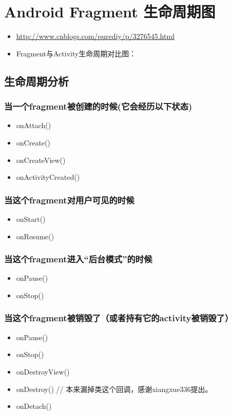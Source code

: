\documentclass[9pt, b5paaper]{book}
\begin{document}
\chapter{Android Fragment 生命周期图}
\label{sec-3}
\begin{itemize}
\item \url{http://www.cnblogs.com/purediy/p/3276545.html}
\item Fragment与Activity生命周期对比图：
\end{itemize}

\section{生命周期分析}
\label{sec-3-1}
\subsection{当一个fragment被创建的时候(它会经历以下状态)}
\label{sec-3-1-1}
\begin{itemize}
\item onAttach()
\item onCreate()
\item onCreateView()
\item onActivityCreated()
\end{itemize}
\subsection{当这个fragment对用户可见的时候}
\label{sec-3-1-2}
\begin{itemize}
\item onStart()
\item onResume()
\end{itemize}
\subsection{当这个fragment进入“后台模式”的时候}
\label{sec-3-1-3}
\begin{itemize}
\item onPause()
\item onStop()
\end{itemize}
\subsection{当这个fragment被销毁了（或者持有它的activity被销毁了）}
\label{sec-3-1-4}
\begin{itemize}
\item onPause()
\item onStop()
\item onDestroyView()
\item onDestroy() // 本来漏掉类这个回调，感谢xiangxue336提出。
\item onDetach()
\end{itemize}
\end{document}

